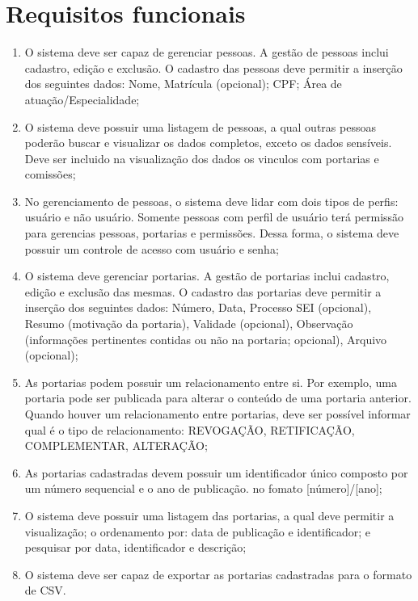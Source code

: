 \documentclass{scrreprt}
\begin{document}
\section{Requisitos funcionais}
\begin{enumerate}[label=\textbf{RF-\arabic*}]
\item
O sistema deve ser capaz de gerenciar pessoas. A gestão de pessoas inclui cadastro, edição e exclusão. O cadastro das pessoas deve permitir a inserção dos seguintes dados: Nome, Matrícula (opcional); CPF; Área de atuação/Especialidade;

\item
O sistema deve possuir uma listagem de pessoas, a qual outras pessoas poderão  buscar e visualizar os dados completos, exceto os dados sensíveis. Deve ser incluido na visualização dos dados os vinculos com portarias e comissões;

\item
No gerenciamento de pessoas, o sistema deve lidar com dois tipos de perfis:
usuário e não usuário. Somente pessoas com perfil de usuário terá permissão para gerencias pessoas, portarias e permissões. Dessa forma, o sistema deve possuir um controle de acesso com usuário e senha;

\item
O sistema deve gerenciar portarias. A gestão de portarias inclui cadastro, edição e exclusão das mesmas. O cadastro das portarias deve permitir a inserção dos seguintes dados: Número, Data, Processo SEI (opcional), Resumo (motivação da portaria), Validade (opcional), Observação (informações pertinentes contidas ou não na portaria; opcional), Arquivo (opcional);

\item
As portarias podem possuir um relacionamento entre si. Por exemplo, uma portaria pode ser publicada para alterar o conteúdo de uma portaria anterior. Quando houver um relacionamento entre portarias, deve ser possível informar qual é o tipo de relacionamento: REVOGAÇÃO, RETIFICAÇÃO, COMPLEMENTAR, ALTERAÇÃO;

\item
As portarias cadastradas devem possuir um identificador único composto por um número sequencial e o ano de publicação. no fomato [número]/[ano];

\item
O sistema deve possuir uma listagem das portarias, a qual deve permitir a visualização; o ordenamento por:  data de publicação e identificador; e pesquisar por data, identificador e descrição;

\item
O sistema deve ser capaz de exportar as portarias cadastradas para o formato de CSV.

\end{enumerate}
\end{document}

